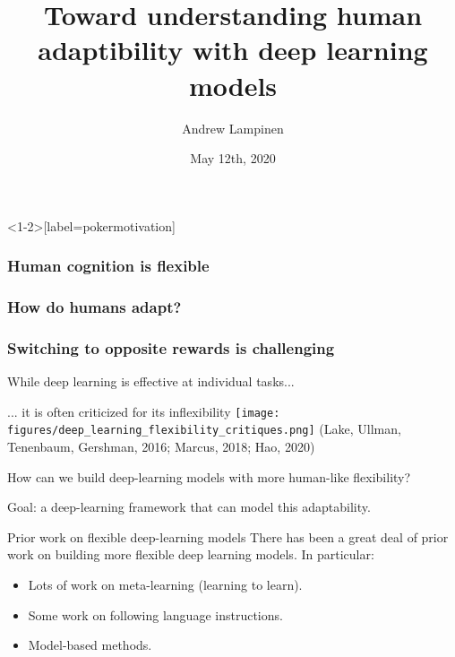 \documentclass{beamer}
\begin{document}
\title{Toward understanding human adaptibility with deep learning models}
\author{Andrew Lampinen}
\date{May 12th, 2020}
\frame{\titlepage}

\begin{frame}<1-2>[label=pokermotivation]
\frametitle<1-2>{Human cognition is flexible}
\frametitle<3-4>{How do humans adapt?}
\frametitle<5>{Switching to opposite rewards is challenging}
\centering
{}
\end{frame}

\begin{frame}{While deep learning is effective at individual tasks...}
\centering
{}
\end{frame}

\begin{frame}{... it is often criticized for its inflexibility}
\texttt{[image: figures/deep\_learning\_flexibility\_critiques.png]}
{\scriptsize (Lake, Ullman, Tenenbaum, Gershman, 2016; Marcus, 2018; Hao, 2020)}
\end{frame}

\begin{frame}[standout]
How can we build deep-learning models with more human-like flexibility?
\end{frame}


\begin{frame}[standout]
Goal: a deep-learning framework that can model this adaptability. 
\end{frame}



\begin{frame}{Prior work on flexible deep-learning models}
There has been a great deal of prior work on building more flexible deep learning models. In particular: 
\begin{itemize}[<+(1)->]
    \item Lots of work on meta-learning (learning to learn).
    \item Some work on following language instructions.
    \item Model-based methods. 
\end{itemize}
\end{frame}
\end{document}
